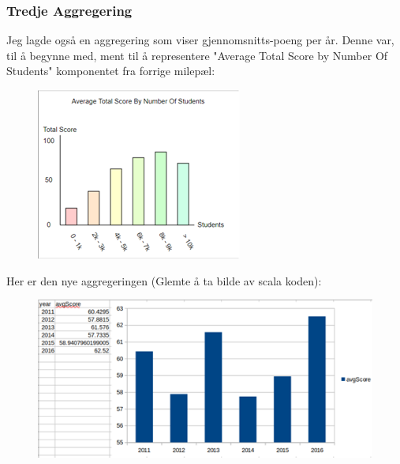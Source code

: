 \subsubsection{Tredje Aggregering}

Jeg lagde også en aggregering som viser gjennomsnitts-poeng per år. Denne var, til å begynne med, ment til å representere "Average Total Score by Number Of Students" komponentet fra forrige milepæl:

\FigureCounter
\begin{figure}[H]
    \includegraphics[width=\textwidth]{images/milepael5/avgScoreTotStudents.png}
\end{figure}

Her er den nye aggregeringen (Glemte å ta bilde av scala koden):

\FigureCounter
\begin{figure}[H]
    \includegraphics[width=\textwidth]{images/milepael5/avgScoreTotStudentsActual.png}
\end{figure}

